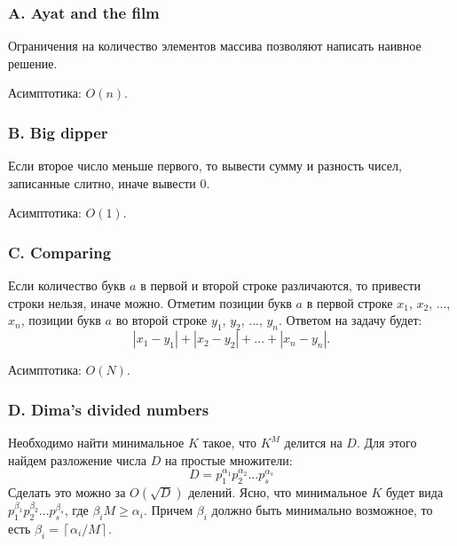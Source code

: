 \subsubsection*{A. Ayat and the film}


Ограничения на количество элементов массива позволяют написать наивное решение.

Асимптотика: $O(n)$.



\subsubsection*{B. Big dipper} 


Если второе число меньше первого, то вывести сумму и разность чисел, записанные слитно, иначе вывести 0. 

Асимптотика: $O(1)$.



\subsubsection*{C. Comparing} 


Если количество букв $a$ в первой и второй строке различаются, то привести строки нельзя, иначе можно. Отметим позиции букв $a$ в первой строке $x_1$, $x_2$, ..., $x_n$, позиции букв $a$ во второй строке $y_1$, $y_2$, ..., $y_n$. Ответом на задачу будет:
$$|x_1 - y_1| + |x_2 - y_2| + ... + |x_n - y_n|.$$

Асимптотика: $O(N)$.



\subsubsection*{D. Dima’s divided numbers} 


Необходимо найти минимальное $K$ такое, что $K^M$ делится на $D$. Для этого найдем разложение числа $D$ на простые множители: $$D = p_1^{\alpha_1} p_2^{\alpha_2} ... p_s^{\alpha_s}$$
Сделать это можно за $O(\sqrt{D})$ делений. Ясно, что минимальное $K$ будет вида $p_1^{\beta_1} p_2^{\beta_2} ... p_s^{\beta_s}$, где $\beta_i M \geqslant \alpha_i$. Причем $\beta_i$ должно быть минимально возможное, то есть $\beta_i = \left \lceil \alpha_i / M \right \rceil$.


